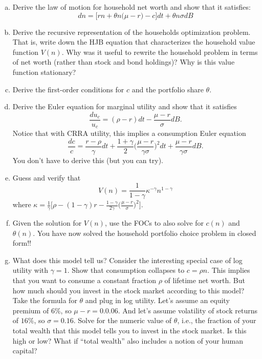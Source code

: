 \documentclass[11pt]{extarticle}
\theoremstyle{plain}
\theoremstyle{definition}
\begin{document}
\vspace{5mm}
\begin{enumerate}[(a)]
\item Derive the law of motion for household net worth and show that it satisfies:
\begin{equation*}
	dn = \bigg[ r n + \theta n \Big( \mu - r \Big) - c \bigg] dt + \theta n \sigma dB
\end{equation*}

\item Derive the recursive representation of the households optimization problem. That is, write down the HJB equation that characterizes the household value function $V(n)$. Why was it useful to rewrite the household problem in terms of net worth (rather than stock and bond holdings)? Why is this value function stationary?

\item Derive the first-order conditions for $c$ and the portfolio share $\theta$.

\item Derive the Euler equation for marginal utility and show that it satisfies 
\begin{equation*}
	\frac{du_c}{u_c} = (\rho - r) dt - \frac{\mu - r}{\sigma} dB.
\end{equation*}
Notice that with CRRA utility, this implies a consumption Euler equation 
\begin{equation*}
	\frac{dc}{c} = \frac{r - \rho}{\gamma} dt + \frac{1+\gamma}{2} \bigg( \frac{\mu - r}{\gamma \sigma} \bigg)^2 dt + \frac{\mu - r}{\gamma \sigma} dB.
\end{equation*}
You don't have to derive this (but you can try). 


\item Guess and verify that 
\begin{equation*}
	V(n) = \frac{1}{1-\gamma} \kappa^{-\gamma} n^{1-\gamma}
\end{equation*}
where $\kappa = \frac{1}{\gamma} \Big[ \rho - (1-\gamma)r - \frac{1-\gamma}{2\gamma} \Big( \frac{\mu-r}{\sigma} \Big)^2 \Big]$. 


\item Given the solution for $V(n)$, use the FOCs to also solve for $c(n)$ and $\theta(n)$. You have now solved the household portfolio choice problem in closed form!!


\item What does this model tell us? Consider the interesting special case of log utility with $\gamma = 1$. Show that consumption collapses to $c = \rho n$. This implies that you want to consume a constant fraction $\rho$ of lifetime net worth. But how much should you invest in the stock market according to this model? Take the formula for $\theta$ and plug in log utility. Let's assume an equity premium of $6\%$, so $\mu-r = 0.0.06$. And let's assume volatility of stock returns of $16\%$, so $\sigma = 0.16$. Solve for the numeric value of $\theta$, i.e., the fraction of your total wealth that this model tells you to invest in the stock market. Is this high or low? What if ``total wealth'' also includes a notion of your human capital?

\end{enumerate}
\end{document}

